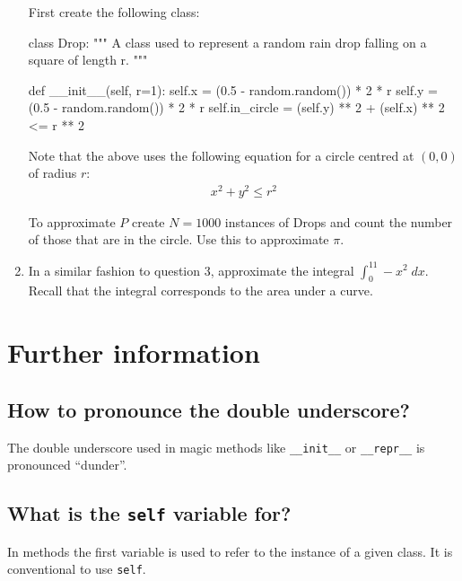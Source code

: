 \begin{enumerate}
First create the following class:

\begin{pyin}
class Drop:
    """
    A class used to represent a random rain drop falling on a square of
    length r.
    """

    def __init__(self, r=1):
        self.x = (0.5 - random.random()) * 2 * r
        self.y = (0.5 - random.random()) * 2 * r
        self.in_circle = (self.y) ** 2 + (self.x) ** 2 <= r ** 2
\end{pyin}


Note that the above uses the following equation for a circle centred at
\((0,0)\) of radius \(r\):
\begin{equation*}
\begin{split}
       x^2+y^2\leq r^2
   \end{split}
\end{equation*}

To approximate \(P\) create \(N=1000\) instances of Drops and count the
number of those that are in the circle. Use this to approximate \(\pi\).

\item 

In a similar fashion to question 3, approximate the integral
\(\int_{0}^11-x^2\;dx\). Recall that the integral corresponds to the area
under a curve.

\end{enumerate}




\section{Further information}

\subsection{How to pronounce the double underscore?}

The double underscore used in magic methods like \texttt{\_\_init\_\_} or
\texttt{\_\_repr\_\_} is
pronounced ``dunder''.


\subsection{What is the \texttt{self} variable for?}

In methods the first variable is used to refer to the instance of a given class.
It is conventional to use \texttt{self}.


